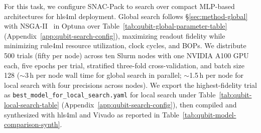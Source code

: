 \documentclass[11pt]{article}
\begin{document}
For this task, we configure SNAC-Pack to search over compact MLP-based architectures for hls4ml deployment.
Global search follows \S\ref{sec:method-global} with NSGA-II~\cite{NSGA} in Optuna over Table~\ref{tab:qubit-global-parameter-table} (Appendix~\ref{app:qubit-search-config}), maximizing readout fidelity while minimizing rule4ml resource utilization, clock cycles, and BOPs.
We distribute 500 trials (fifty per node) across ten Slurm nodes with one NVIDIA A100 GPU each, five epochs per trial, stratified three-fold cross-validation, and batch size 128 ($\sim$3\,h per node wall time for global search in parallel; $\sim$1.5\,h per node for local search with four precisions across nodes).
We export the highest-fidelity trial as \texttt{best\_model\_for\_local\_search.yaml} for local search under Table~\ref{tab:qubit-local-search-table} (Appendix~\ref{app:qubit-search-config}), then compiled and synthesized with  hls4ml and Vivado as reported in Table~\ref{tab:qubit-model-comparison-synth}.
\end{document}
